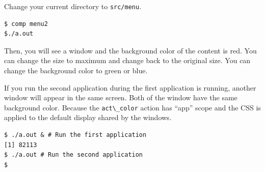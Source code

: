 Change your current directory to \passthrough{\lstinline!src/menu!}.

\begin{lstlisting}
$ comp menu2
$./a.out
\end{lstlisting}

Then, you will see a window and the background color of the content is
red. You can change the size to maximum and change back to the original
size. You can change the background color to green or blue.

If you run the second application during the first application is
running, another window will appear in the same screen. Both of the
window have the same background color. Because the
\passthrough{\lstinline!act\_color!} action has ``app'' scope and the
CSS is applied to the default display shared by the windows.

\begin{lstlisting}
$ ./a.out & # Run the first application
[1] 82113
$ ./a.out # Run the second application
$ 
\end{lstlisting}
